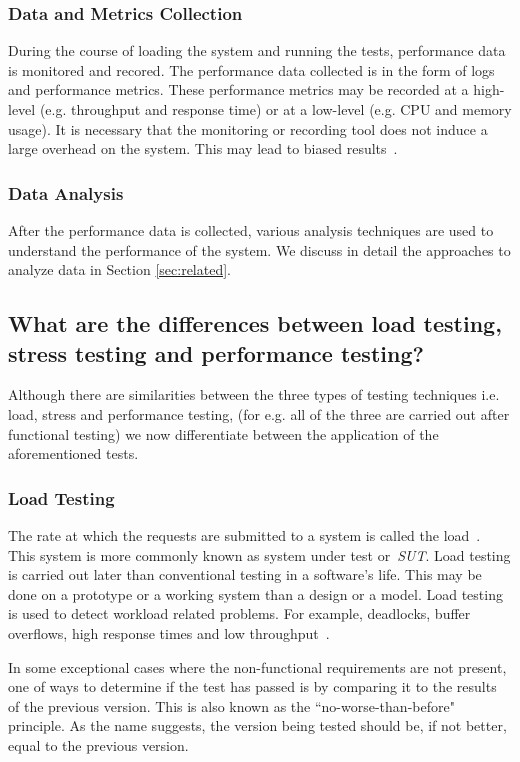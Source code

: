 \subsubsection{Data and Metrics Collection}

During the course of loading the system and running the tests, performance data is monitored and recored. The performance data collected is in the form of logs and performance metrics. These performance metrics may be recorded at a high-level (e.g. throughput and response time) or at a low-level (e.g. CPU and memory usage). It is necessary that the monitoring or recording tool does not induce a large overhead on the system. This may lead to biased results~\cite{mytkowicz2010evaluating}.

\subsubsection{Data Analysis}
After the performance data is collected, various analysis techniques are used to understand the performance of the system. We discuss in detail the approaches to analyze data in Section \ref{sec:related}.


\subsection{What are the differences between load testing, stress testing and performance testing?}

Although there are similarities between the three types of testing techniques i.e. load, stress and performance testing, (for e.g. all of the three are carried out after functional testing) we now differentiate between the application of the aforementioned tests.

\subsubsection{Load Testing}

The rate at which the requests are submitted to a system is called the load~\cite{Beizer:1984}. This system is more commonly known as system under test or~\textit{SUT}. Load testing is carried out later than conventional testing in a software's life. This may be done on a prototype or a working system than a design or a model. Load testing is used to detect workload related problems. For example, deadlocks, buffer overflows, high response times and low throughput~\cite{464549,Barna:2011,6032540}. 

In some exceptional cases where the non-functional requirements are not present, one of ways to determine if the test has passed is by comparing it to the results of the previous version. This is also known as the ``no-worse-than-before" principle. As the name suggests, the version being tested should be, if not better, equal to the previous version.~\cite{Dumke:2001}

